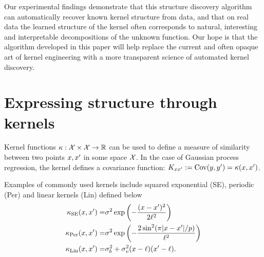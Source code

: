 \documentclass[twoside]{article}
\begin{document}

Our experimental findings demonstrate that this structure discovery algorithm can automatically recover known kernel structure from data, and that on real data the learned structure of the kernel often corresponds to natural, interesting and interpretable decompositions of the unknown function.
Our hope is that the algorithm developed in this paper will help replace the current and often opaque art of kernel engineering with a more transparent science of automated kernel discovery.


\section{Expressing structure through kernels}
\label{sec:Structure}

Kernel functions $\kappa : \mathcal{X} \times \mathcal{X} \to \mathbb{R}$ can be used to define a measure of similarity between two points $x, x'$ in some space $\mathcal{X}$.
In the case of Gaussian process regression, the kernel defines a covariance function: ${K_{x x'} := \textrm{Cov}(y, y') = \kappa(x,x')}$. 

Examples of commonly used kernels include squared exponential (SE), periodic (Per) and linear kernels (Lin) defined below
\begin{eqnarray}
\kappa_\textrm{SE}(x, x') = & \sigma^2\exp\left(-\frac{(x - x')^2}{2\ell^2}\right) \\
\kappa_\textrm{Per}(x, x') = & \sigma^2\exp\left(-\frac{2\sin^2(\pi|x - x'|/p)}{\ell^2}\right) \\
\kappa_\textrm{Lin}(x, x') = & \sigma_b^2 + \sigma_v^2(x - \ell)(x' - \ell).
\end{eqnarray}
\end{document}
